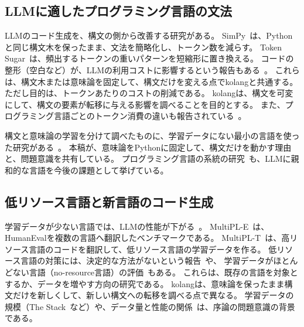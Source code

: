 \documentclass{ipsjprosym}
\begin{document}

\subsection{LLMに適したプログラミング言語の文法}

LLMのコード生成を、構文の側から改善する研究がある。
SimPy~\cite{Sun2024SimPy}は、Pythonと同じ構文木を保ったまま、文法を簡略化し、トークン数を減らす。
Token Sugar~\cite{Sun2025TokenSugar}は、頻出するトークンの重いパターンを短縮形に置き換える。
コードの整形（空白など）が、LLMの利用コストに影響するという報告もある~\cite{Pan2025Format}。
これらは、構文木または意味論を固定して、構文だけを変える点でkolangと共通する。
ただし目的は、トークンあたりのコストの削減である。
kolangは、構文を可変にして、構文の要素が転移に与える影響を調べることを目的とする。
また、プログラミング言語ごとのトークン消費の違いも報告されている~\cite{Wu2026Token}。

構文と意味論の学習を分けて調べたものに、学習データにない最小の言語を使った研究がある~\cite{Kumar2026PyLang}。
本稿が、意味論をPythonに固定して、構文だけを動かす理由と、問題意識を共有している。
プログラミング言語の系統の研究~\cite{Yun2025Families}も、LLMに親和的な言語を今後の課題として挙げている。

\subsection{低リソース言語と新言語のコード生成}

学習データが少ない言語では、LLMの性能が下がる~\cite{Joel2024Survey}。
MultiPL-E~\cite{Cassano2023MultiPLE}は、HumanEvalを複数の言語へ翻訳したベンチマークである。
MultiPL-T~\cite{Cassano2024MultiPLT}は、高リソース言語のコードを翻訳して、低リソース言語の学習データを作る。
低リソース言語の対策には、決定的な方法がないという報告~\cite{Giagnorio2025NoSilver}や、
学習データがほとんどない言語（no-resource言語）の評価~\cite{Giagnorio2026NoResource}もある。
これらは、既存の言語を対象とするか、データを増やす方向の研究である。
kolangは、意味論を保ったまま構文だけを新しくして、新しい構文への転移を調べる点で異なる。
学習データの規模（The Stack~\cite{Kocetkov2022Stack}など）や、データ量と性能の関係~\cite{Kaplan2020Scaling}は、序論の問題意識の背景である。
\end{document}
